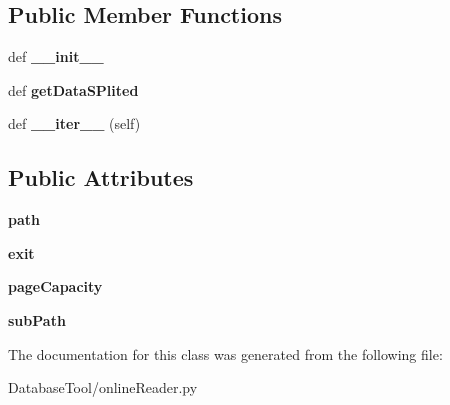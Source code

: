 \subsection*{Public Member Functions}
\begin{DoxyCompactItemize}
\item 
\mbox{\label{classMIS_1_1DatabaseTool_1_1onlineReader_1_1Cormis__CachingHDFIterator_a88e4d631d88d40386712959e45d8a802}} 
def {\bfseries \+\_\+\+\_\+init\+\_\+\+\_\+}
\item 
\mbox{\label{classMIS_1_1DatabaseTool_1_1onlineReader_1_1Cormis__CachingHDFIterator_aa96a6812075079d47d96f3d66340e9eb}} 
def {\bfseries get\+Data\+S\+Plited}
\item 
\mbox{\label{classMIS_1_1DatabaseTool_1_1onlineReader_1_1Cormis__CachingHDFIterator_a0316b9f14c4ba16428c70d0b8f0656f4}} 
def {\bfseries \+\_\+\+\_\+iter\+\_\+\+\_\+} (self)
\end{DoxyCompactItemize}
\subsection*{Public Attributes}
\begin{DoxyCompactItemize}
\item 
\mbox{\label{classMIS_1_1DatabaseTool_1_1onlineReader_1_1Cormis__CachingHDFIterator_ae474f768076899788655b4853160d005}} 
{\bfseries path}
\item 
\mbox{\label{classMIS_1_1DatabaseTool_1_1onlineReader_1_1Cormis__CachingHDFIterator_ab913454f420c464ca00ffe1a8be3204e}} 
{\bfseries exit}
\item 
\mbox{\label{classMIS_1_1DatabaseTool_1_1onlineReader_1_1Cormis__CachingHDFIterator_adc68b287e3b20b7fb76311ee673d7cb0}} 
{\bfseries page\+Capacity}
\item 
\mbox{\label{classMIS_1_1DatabaseTool_1_1onlineReader_1_1Cormis__CachingHDFIterator_ac66e1dfbd77578a2971247ead23e8d2e}} 
{\bfseries sub\+Path}
\end{DoxyCompactItemize}


The documentation for this class was generated from the following file\+:\begin{DoxyCompactItemize}
\item 
Database\+Tool/online\+Reader.\+py\end{DoxyCompactItemize}
